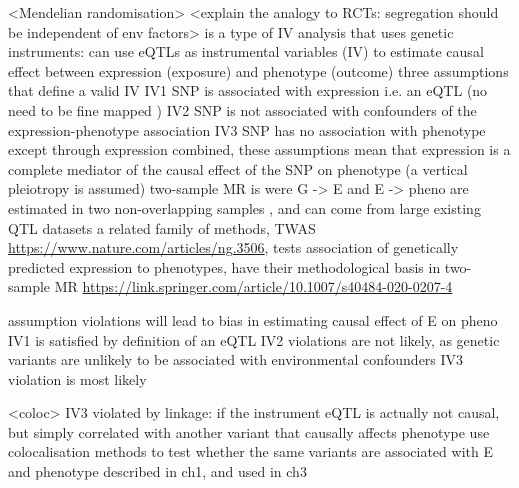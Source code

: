 \begin{outline}
\1 <Mendelian randomisation>
    \2 <explain the analogy to RCTs: segregation should be independent of env factors>
    \2 is a type of IV analysis that uses genetic instruments: can use eQTLs as instrumental variables (IV) to estimate causal effect between expression (exposure) and phenotype (outcome)
    \2 three assumptions that define a valid IV \autocite{daveysmith2014MendelianRandomizationGenetic,hemani2018EvaluatingPotentialRole,neumeyer2020StrengtheningCausalInference}
        \3 IV1 SNP is associated with expression i.e. an eQTL (no need to be fine mapped \autocite{daveysmith2014MendelianRandomizationGenetic,burgess2018InferringCausalRelationships})
        \3 IV2 SNP is not associated with confounders of the expression-phenotype association 
        \3 IV3 SNP has no association with phenotype except through expression 
    \2 combined, these assumptions mean that expression is a complete mediator of the causal effect of the SNP on phenotype (a vertical pleiotropy is assumed)
    \2 two-sample MR is were G -> E and E -> pheno are estimated in two non-overlapping samples \autocite{hemani2018EvaluatingPotentialRole,neumeyer2020StrengtheningCausalInference}, and can come from large existing QTL datasets
        \3 a related family of methods, TWAS \url{https://www.nature.com/articles/ng.3506}, tests association of genetically predicted expression to phenotypes, have their methodological basis in two-sample MR \url{https://link.springer.com/article/10.1007/s40484-020-0207-4}

\1 assumption violations will lead to bias in estimating causal effect of E on pheno
    \2 IV1 is satisfied by definition of an eQTL
    \2 IV2 violations are not likely, as genetic variants are unlikely to be associated with environmental confounders 
    \2 IV3 violation is most likely

\1 <coloc>
    \2 IV3 violated by linkage: if the instrument eQTL is actually not causal, but simply correlated with another variant that causally affects phenotype
        \3 use colocalisation methods to test whether the same variants are associated with E and phenotype \autocite{hemani2018EvaluatingPotentialRole}
        \3 described in ch1, and used in ch3


\end{outline}
